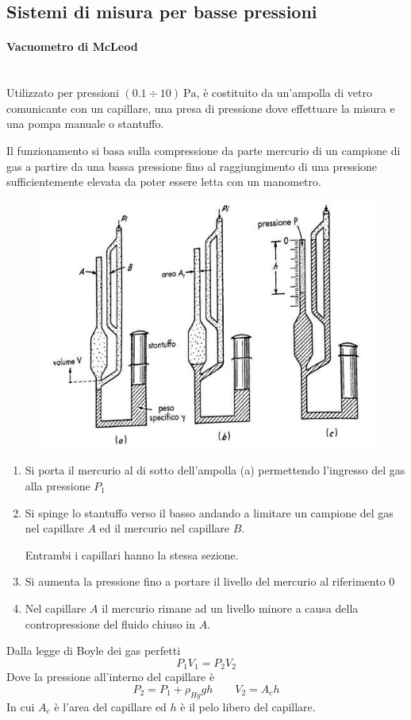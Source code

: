 \documentclass[a4paper, 15pt]{article}
\begin{document}
\subsection{Sistemi di misura per basse pressioni}
\begin{adjustwidth}{2in}{} 
\nointerlineskip\leavevmode
\paragraph{Vacuometro di McLeod} \mbox{} \\
		Utilizzato per pressioni $(0.1\div10)~\text{Pa}$, è costituito da un'ampolla di vetro comunicante con un capillare, una presa di pressione dove effettuare la misura e una pompa manuale o stantuffo.
		
		Il funzionamento si basa sulla compressione da parte mercurio di un campione di gas a partire da una bassa pressione fino al raggiungimento di una pressione sufficientemente elevata da poter essere letta con un manometro. 		 
		\begin{figure}[H]
			\centering
			\includegraphics[width=0.4\linewidth]{immagini/manometro14}
			\label{fig:manometro14}
		\end{figure}				
		\begin{enumerate}
			\item Si porta il mercurio al di sotto dell'ampolla (a) permettendo l'ingresso del gas alla pressione $P_1$
			\item Si spinge lo stantuffo verso il basso andando a limitare un campione del gas nel capillare $A$ ed il mercurio nel capillare $B$.
			
			Entrambi i capillari hanno la stessa sezione.
			\item Si aumenta la pressione fino a portare il livello del mercurio al riferimento 0
			\item Nel capillare $A$ il mercurio rimane ad un livello minore a causa della contropressione del fluido chiuso in $A$.
		\end{enumerate}
		
		Dalla legge di Boyle dei gas perfetti
		\[P_1V_1 = P_2V_2\]
		Dove la pressione all'interno del capillare è
		\[P_2 = P_1 + \rho_{Hg}gh\qquad V_2 = A_ch \]
		In cui $A_c$ è l'area del capillare ed $h$ è il pelo libero del capillare. 
		

\end{adjustwidth}
\end{document}
